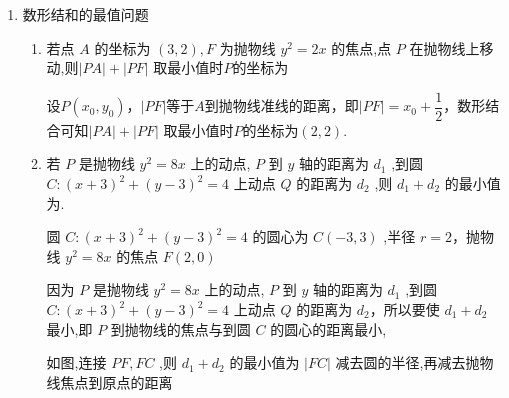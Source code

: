 \begin{enumerate}
\begin{enumerate}
\begin{jieda}
            设 $\left| {AF}\right|  = a,\left| {BF}\right|  = b$，由抛物线定义得 $\left| {AF}\right|  = \left| {AD}\right| ,\left| {BF}\right|  = \left| {BE}\right|$
            
            在梯形 ${ABED}$ 中, $2\left| {MN}\right|  = \left| {AD}\right|  + \left| {BE}\right|  = a + b$. 
            
            因为 ${AF}\bot {AB},\angle {ABF} = {30}^{ \circ  }$，所以 $b = {2a}$ ,则 $\left| {MN}\right|  = \dfrac{3a}{2}$，$\left| {AB}\right|  = \sqrt{3}a$，故 $\dfrac{\left| MN\right| }{\left| AB\right| } = \dfrac{\sqrt{3}}{2}$ .
        \end{jieda}
        
    \end{enumerate}
    
    \item 数形结和的最值问题
    \begin{enumerate}
        \item 若点 $A$ 的坐标为 $\left( {3,2}\right) ,F$ 为抛物线 ${y}^{2} = {2x}$ 的焦点,点 $P$ 在抛物线上移动,则$\left| {PA}\right|  + \left| {PF}\right|$ 取最小值时$P$的坐标为
        \begin{jieda}
            设$P(x_0, y_0)$，$|PF|$等于$A$到抛物线准线的距离，即$|PF| = x_0 + \dfrac{1}{2}$，数形结合可知$\left| {PA}\right|  + \left| {PF}\right|$ 取最小值时$P$的坐标为$(2, 2)$.
        \end{jieda}
            
        \item 若 $P$ 是抛物线 ${y}^{2} = {8x}$ 上的动点, $P$ 到 $y$ 轴的距离为 ${d}_{1}$ ,到圆 $C : {\left( x + 3\right) }^{2} + {\left( y - 3\right) }^{2} = 4$ 上动点 $Q$ 的距离为 ${d}_{2}$ ,则 ${d}_{1} + {d}_{2}$ 的最小值为.
        \begin{jieda}
            圆 $C : {\left( x + 3\right) }^{2} + {\left( y - 3\right) }^{2} = 4$ 的圆心为 $C\left( {-3,3}\right)$ ,半径 $r = 2$，抛物线 ${y}^{2} = {8x}$ 的焦点 $F\left( {2,0}\right)$
            
            因为 $P$ 是抛物线 ${y}^{2} = {8x}$ 上的动点, $P$ 到 $y$ 轴的距离为 ${d}_{1}$ ,到圆 $C : {\left( x + 3\right) }^{2} + {\left( y - 3\right) }^{2} = 4$ 上动点 $Q$ 的距离为 ${d}_{2}$，所以要使 ${d}_{1} + {d}_{2}$ 最小,即 $P$ 到抛物线的焦点与到圆 $C$ 的圆心的距离最小,
            
            如图,连接 ${PF},{FC}$ ,则 ${d}_{1} + {d}_{2}$ 的最小值为 $\left| {FC}\right|$ 减去圆的半径,再减去抛物线焦点到原点的距离
            

\end{jieda}
\end{enumerate}
\end{enumerate}
